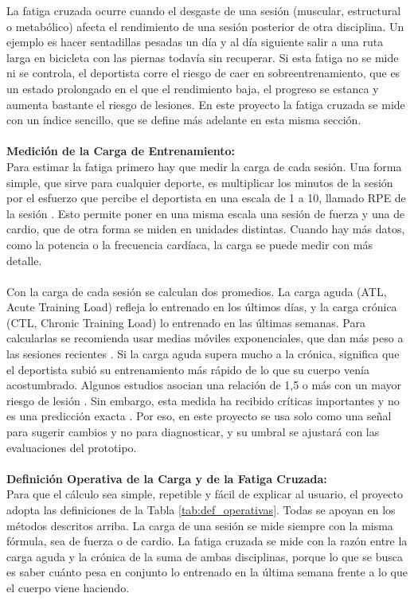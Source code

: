 La fatiga cruzada ocurre cuando el desgaste de una sesión (muscular, estructural o metabólico) afecta el rendimiento de una sesión posterior de otra disciplina. Un ejemplo es hacer sentadillas pesadas un día y al día siguiente salir a una ruta larga en bicicleta con las piernas todavía sin recuperar. Si esta fatiga no se mide ni se controla, el deportista corre el riesgo de caer en sobreentrenamiento, que es un estado prolongado en el que el rendimiento baja, el progreso se estanca y aumenta bastante el riesgo de lesiones. En este proyecto la fatiga cruzada se mide con un índice sencillo, que se define más adelante en esta misma sección.
\\\\
\textbf{Medición de la Carga de Entrenamiento:}\\
Para estimar la fatiga primero hay que medir la carga de cada sesión. Una forma simple, que sirve para cualquier deporte, es multiplicar los minutos de la sesión por el esfuerzo que percibe el deportista en una escala de 1 a 10, llamado RPE de la sesión \citep{foster2001monitoring}. Esto permite poner en una misma escala una sesión de fuerza y una de cardio, que de otra forma se miden en unidades distintas. Cuando hay más datos, como la potencia o la frecuencia cardíaca, la carga se puede medir con más detalle.
\\\\
Con la carga de cada sesión se calculan dos promedios. La carga aguda (ATL, Acute Training Load) refleja lo entrenado en los últimos días, y la carga crónica (CTL, Chronic Training Load) lo entrenado en las últimas semanas. Para calcularlas se recomienda usar medias móviles exponenciales, que dan más peso a las sesiones recientes \citep{williams2017better}. Si la carga aguda supera mucho a la crónica, significa que el deportista subió su entrenamiento más rápido de lo que su cuerpo venía acostumbrado. Algunos estudios asocian una relación de 1,5 o más con un mayor riesgo de lesión \citep{gabbett2016training}. Sin embargo, esta medida ha recibido críticas importantes y no es una predicción exacta \citep{impellizzeri2020acute}. Por eso, en este proyecto se usa solo como una señal para sugerir cambios y no para diagnosticar, y su umbral se ajustará con las evaluaciones del prototipo.
\\\\
\textbf{Definición Operativa de la Carga y de la Fatiga Cruzada:}\\
Para que el cálculo sea simple, repetible y fácil de explicar al usuario, el proyecto adopta las definiciones de la Tabla \ref{tab:def_operativas}. Todas se apoyan en los métodos descritos arriba. La carga de una sesión se mide siempre con la misma fórmula, sea de fuerza o de cardio. La fatiga cruzada se mide con la razón entre la carga aguda y la crónica de la suma de ambas disciplinas, porque lo que se busca es saber cuánto pesa en conjunto lo entrenado en la última semana frente a lo que el cuerpo viene haciendo.

